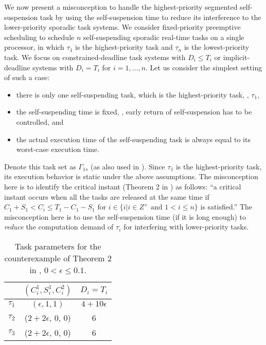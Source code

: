 We now present a misconception to handle the highest-priority segmented self-suspension task by using the self-suspension time to reduce its interference to the lower-priority sporadic task systems. 
We consider fixed-priority preemptive scheduling to schedule $n$ self-suspending sporadic real-time tasks on a single processor, in which $\tau_1$ is the highest-priority task and $\tau_n$ is the lowest-priority task. We focus on constrained-deadline task systems with $D_i \leq T_i$ or implicit-deadline systems with $D_i=T_i$ for $i=1,\ldots,n$.
Let us consider the simplest setting of such a case:
\begin{itemize}
\item there is only one self-suspending task, which is the highest-priority task, \ie, $\tau_1$,
\item the self-suspending time is fixed, \ie, early return of self-suspension has to be controlled, and
\item the actual execution time of the self-suspending task is always equal to its worst-case execution time.
\end{itemize}
Denote this task set as $\Gamma_{1s}$ (as also used in \cite{RTSS-KimANR13}).  Since $\tau_1$ is the highest-priority task, its execution behavior is static under the above assumptions. The misconception here is to identify the critical instant  (Theorem 2 in \cite{RTSS-KimANR13}) as follows: ``a critical instant occurs when all the tasks are released at the same time if $C_1 +S_1 < C_i  \leq T_1-C_1-S_1 \mbox{ for } i \in\{i|i\in Z^{+} \mbox{ and } 1<i\leq n\}$ is satisfied.'' The misconception here is to use the self-suspension time (if it is long enough) to \emph{reduce} the computation demand of $\tau_i$ for interfering with lower-priority tasks. 


\begin{table} [t]
\centering
    \begin{tabular}{|c|c|c|}
 \hline
        & $(C_i^1, S_i^1, C_i^2)$ &  $D_i=T_i$\\ 
        \hline
        $\tau_1$ & $(\epsilon, 1, 1)$ &  $4+10\epsilon$\\ 
        $\tau_2$ &  ($2+2\epsilon$, 0, 0) & 6  \\ 
        $\tau_3$ & ($2+2\epsilon$, 0, 0) & 6  \\
        \hline
    \end{tabular} 
    \caption{Task parameters for the counterexample of Theorem 2 in \cite{RTSS-KimANR13}, $0 < \epsilon \leq 0.1$.}
    \label{table:ex-highest-priority}
\end{table}


